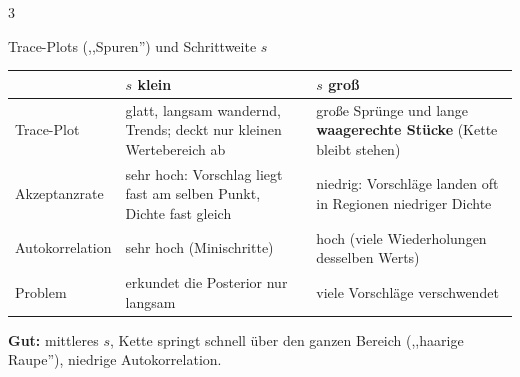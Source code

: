 \documentclass[8pt,a4paper,landscape]{extarticle}
\renewcommand{\arraystretch}{1.12}
\newcommand{\traceKlein}[1]{\draw[#1] plot coordinates {(0.000,-0.293) (0.017,-0.287) (0.034,-0.294) (0.051,-0.325) (0.068,-0.339) (0.084,-0.335) (0.101,-0.340) (0.118,-0.340) (0.135,-0.332) (0.152,-0.317) (0.169,-0.317) (0.186,-0.308) (0.203,-0.311) (0.219,-0.281) (0.236,-0.285) (0.253,-0.299) (0.270,-0.285) (0.287,-0.283) (0.304,-0.283) (0.321,-0.283) (0.338,-0.279) (0.354,-0.286) (0.371,-0.286) (0.388,-0.264) (0.405,-0.261) (0.422,-0.264) (0.439,-0.255) (0.456,-0.258) (0.472,-0.254) (0.489,-0.244) (0.506,-0.244) (0.523,-0.244) (0.540,-0.244) (0.557,-0.233) (0.574,-0.233) (0.591,-0.228) (0.608,-0.203) (0.624,-0.197) (0.641,-0.175) (0.658,-0.181) (0.675,-0.155) (0.692,-0.143) (0.709,-0.138) (0.726,-0.150) (0.743,-0.129) (0.759,-0.138) (0.776,-0.135) (0.793,-0.154) (0.810,-0.154) (0.827,-0.142) (0.844,-0.147) (0.861,-0.151) (0.878,-0.163) (0.894,-0.165) (0.911,-0.162) (0.928,-0.138) (0.945,-0.170) (0.962,-0.180) (0.979,-0.180) (0.996,-0.163) (1.013,-0.178) (1.029,-0.177) (1.046,-0.146) (1.063,-0.134) (1.080,-0.106) (1.097,-0.085) (1.114,-0.088) (1.131,-0.064) (1.147,-0.069) (1.164,-0.061) (1.181,-0.076) (1.198,-0.038) (1.215,-0.046) (1.232,-0.067) (1.249,-0.054) (1.266,-0.049) (1.282,-0.046) (1.299,-0.051) (1.316,-0.049) (1.333,-0.056) (1.350,-0.062) (1.367,-0.068) (1.384,-0.055) (1.401,-0.029) (1.418,-0.015) (1.434,-0.013) (1.451,0.004) (1.468,0.006) (1.485,0.002) (1.502,0.014) (1.519,0.048) (1.536,0.082) (1.552,0.076) (1.569,0.087) (1.586,0.093) (1.603,0.118) (1.620,0.135) (1.637,0.120) (1.654,0.101) (1.671,0.117) (1.688,0.127) (1.704,0.131) (1.721,0.127) (1.738,0.139) (1.755,0.149) (1.772,0.167) (1.789,0.154) (1.806,0.145) (1.823,0.146) (1.839,0.143) (1.856,0.140) (1.873,0.137) (1.890,0.155) (1.907,0.124) (1.924,0.122) (1.941,0.131) (1.958,0.103) (1.974,0.101) (1.991,0.082) (2.008,0.093) (2.025,0.083) (2.042,0.074) (2.059,0.077) (2.076,0.065) (2.093,0.101) (2.109,0.103) (2.126,0.102) (2.143,0.094) (2.160,0.096) (2.177,0.078) (2.194,0.076) (2.211,0.061) (2.228,0.070) (2.244,0.082) (2.261,0.093) (2.278,0.106) (2.295,0.105) (2.312,0.125) (2.329,0.119) (2.346,0.149) (2.363,0.147) (2.379,0.166) (2.396,0.172) (2.413,0.159) (2.430,0.168) (2.447,0.171) (2.464,0.162) (2.481,0.148) (2.498,0.147) (2.514,0.148) (2.531,0.139) (2.548,0.121) (2.565,0.126) (2.582,0.100) (2.599,0.100) (2.616,0.115) (2.633,0.115) (2.649,0.095) (2.666,0.108) (2.683,0.117)};}
\newcommand{\traceGut}[1]{\draw[#1] plot coordinates {(0.000,-0.231) (0.017,-0.231) (0.034,-0.231) (0.051,-0.231) (0.068,-0.022) (0.084,-0.022) (0.101,-0.022) (0.118,0.089) (0.135,0.089) (0.152,0.089) (0.169,-0.103) (0.186,-0.103) (0.203,-0.103) (0.219,-0.040) (0.236,-0.004) (0.253,0.028) (0.270,0.028) (0.287,0.028) (0.304,-0.077) (0.321,0.153) (0.338,0.153) (0.354,0.153) (0.371,0.124) (0.388,-0.154) (0.405,-0.154) (0.422,-0.154) (0.439,-0.098) (0.456,0.110) (0.472,0.110) (0.489,0.110) (0.506,0.073) (0.523,-0.003) (0.540,-0.087) (0.557,0.094) (0.574,0.094) (0.591,0.094) (0.608,0.094) (0.624,0.094) (0.641,-0.025) (0.658,-0.025) (0.675,-0.025) (0.692,-0.072) (0.709,0.072) (0.726,0.072) (0.743,0.072) (0.759,0.072) (0.776,0.117) (0.793,0.117) (0.810,0.117) (0.827,0.117) (0.844,0.117) (0.861,0.010) (0.878,0.010) (0.894,-0.158) (0.911,0.160) (0.928,0.191) (0.945,0.191) (0.962,-0.138) (0.979,-0.099) (0.996,-0.099) (1.013,0.051) (1.029,0.051) (1.046,0.051) (1.063,0.051) (1.080,0.051) (1.097,-0.075) (1.114,-0.214) (1.131,-0.231) (1.147,0.098) (1.164,-0.049) (1.181,-0.049) (1.198,0.352) (1.215,0.303) (1.232,0.180) (1.249,0.180) (1.266,0.154) (1.282,0.154) (1.299,0.123) (1.316,0.123) (1.333,0.121) (1.350,0.121) (1.367,0.054) (1.384,0.054) (1.401,0.054) (1.418,0.054) (1.434,0.045) (1.451,-0.048) (1.468,-0.092) (1.485,0.028) (1.502,0.028) (1.519,0.028) (1.536,0.028) (1.552,0.028) (1.569,0.028) (1.586,0.028) (1.603,0.028) (1.620,-0.056) (1.637,-0.056) (1.654,-0.059) (1.671,-0.059) (1.688,-0.047) (1.704,-0.047) (1.721,-0.263) (1.738,-0.093) (1.755,-0.249) (1.772,-0.089) (1.789,0.011) (1.806,0.011) (1.823,-0.086) (1.839,0.006) (1.856,0.006) (1.873,0.006) (1.890,0.006) (1.907,0.006) (1.924,0.006) (1.941,0.006) (1.958,-0.115) (1.974,0.165) (1.991,0.048) (2.008,0.048) (2.025,0.048) (2.042,0.048) (2.059,0.048) (2.076,0.025) (2.093,0.025) (2.109,0.025) (2.126,0.025) (2.143,-0.043) (2.160,-0.043) (2.177,0.204) (2.194,0.327) (2.211,0.327) (2.228,0.327) (2.244,0.096) (2.261,-0.036) (2.278,-0.036) (2.295,-0.036) (2.312,-0.036) (2.329,-0.036) (2.346,0.203) (2.363,0.203) (2.379,-0.106) (2.396,-0.101) (2.413,-0.101) (2.430,-0.101) (2.447,-0.101) (2.464,-0.101) (2.481,-0.011) (2.498,-0.011) (2.514,-0.011) (2.531,-0.011) (2.548,0.095) (2.565,0.095) (2.582,0.095) (2.599,0.046) (2.616,0.046) (2.633,-0.153) (2.649,-0.195) (2.666,-0.195) (2.683,-0.029)};}
\newcommand{\traceGross}[1]{\draw[#1] plot coordinates {(0.000,-0.325) (0.017,0.152) (0.034,0.152) (0.051,0.152) (0.068,0.152) (0.084,0.152) (0.101,0.152) (0.118,0.152) (0.135,0.152) (0.152,-0.135) (0.169,-0.135) (0.186,-0.135) (0.203,-0.135) (0.219,-0.135) (0.236,-0.135) (0.253,-0.135) (0.270,-0.135) (0.287,-0.135) (0.304,-0.135) (0.321,-0.135) (0.338,-0.135) (0.354,-0.135) (0.371,-0.135) (0.388,-0.135) (0.405,-0.135) (0.422,0.004) (0.439,0.004) (0.456,-0.153) (0.472,-0.153) (0.489,-0.153) (0.506,-0.153) (0.523,-0.153) (0.540,-0.153) (0.557,-0.153) (0.574,-0.153) (0.591,-0.153) (0.608,-0.153) (0.624,-0.153) (0.641,-0.153) (0.658,-0.153) (0.675,-0.192) (0.692,-0.192) (0.709,-0.192) (0.726,-0.192) (0.743,-0.192) (0.759,-0.192) (0.776,0.054) (0.793,0.054) (0.810,0.054) (0.827,0.054) (0.844,0.054) (0.861,0.054) (0.878,0.054) (0.894,0.054) (0.911,0.054) (0.928,0.054) (0.945,0.065) (0.962,0.065) (0.979,0.065) (0.996,0.065) (1.013,0.065) (1.029,0.065) (1.046,0.065) (1.063,0.065) (1.080,0.065) (1.097,0.065) (1.114,0.065) (1.131,0.065) (1.147,0.065) (1.164,0.065) (1.181,0.065) (1.198,0.065) (1.215,0.065) (1.232,0.065) (1.249,0.065) (1.266,0.065) (1.282,0.065) (1.299,0.065) (1.316,0.065) (1.333,0.065) (1.350,0.065) (1.367,0.065) (1.384,0.065) (1.401,0.065) (1.418,0.065) (1.434,0.065) (1.451,0.065) (1.468,0.065) (1.485,0.065) (1.502,0.065) (1.519,0.065) (1.536,0.065) (1.552,0.160) (1.569,0.160) (1.586,0.160) (1.603,0.160) (1.620,0.160) (1.637,0.160) (1.654,0.160) (1.671,0.160) (1.688,0.160) (1.704,0.160) (1.721,0.160) (1.738,0.160) (1.755,0.081) (1.772,0.081) (1.789,0.081) (1.806,0.081) (1.823,0.081) (1.839,0.081) (1.856,0.081) (1.873,0.066) (1.890,0.066) (1.907,0.066) (1.924,0.066) (1.941,0.066) (1.958,0.066) (1.974,0.066) (1.991,0.066) (2.008,0.066) (2.025,0.066) (2.042,0.246) (2.059,0.246) (2.076,0.246) (2.093,0.246) (2.109,0.246) (2.126,0.299) (2.143,0.299) (2.160,0.299) (2.177,0.299) (2.194,0.299) (2.211,0.299) (2.228,0.299) (2.244,0.299) (2.261,0.299) (2.278,0.299) (2.295,0.299) (2.312,0.299) (2.329,0.299) (2.346,0.299) (2.363,0.299) (2.379,0.299) (2.396,0.299) (2.413,0.370) (2.430,0.370) (2.447,0.370) (2.464,0.370) (2.481,0.370) (2.498,0.370) (2.514,0.370) (2.531,0.315) (2.548,0.315) (2.565,0.315) (2.582,0.315) (2.599,0.315) (2.616,0.315) (2.633,0.315) (2.649,0.315) (2.666,0.315) (2.683,0.315)};}
\begin{document}
\begin{multicols*}{3}
\begin{rechnen}{Trace-Plots (,,Spuren'') und Schrittweite $s$}
\begin{center}
\end{center}
{\renewcommand{\arraystretch}{1.15}\begin{tabularx}{\linewidth}{@{}>{\raggedright\arraybackslash}p{2.15cm}>{\raggedright\arraybackslash}X>{\raggedright\arraybackslash}X@{}}
 & \textbf{$s$ klein} & \textbf{$s$ groß} \\
\hline
Trace-Plot & glatt, langsam wandernd, Trends; deckt nur kleinen Wertebereich ab & große Sprünge und lange \textbf{waagerechte Stücke} (Kette bleibt stehen) \\
Akzeptanzrate & sehr hoch: Vorschlag liegt fast am selben Punkt, Dichte fast gleich & niedrig: Vorschläge landen oft in Regionen niedriger Dichte \\
Autokorrelation & sehr hoch (Minischritte) & hoch (viele Wiederholungen desselben Werts) \\
Problem & erkundet die Posterior nur langsam & viele Vorschläge verschwendet \\
\end{tabularx}}
\textbf{Gut:} mittleres $s$, Kette springt schnell über den ganzen Bereich (,,haarige Raupe''), niedrige Autokorrelation.
\end{rechnen}


\end{multicols*}
\end{document}
